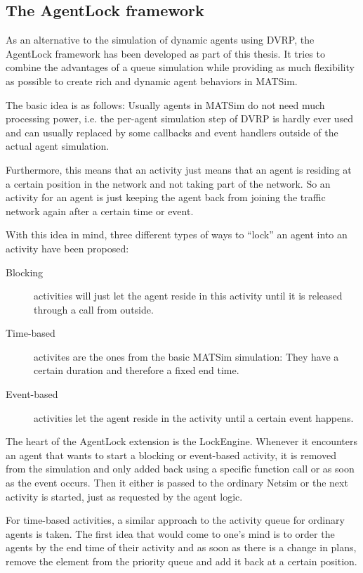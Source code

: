 \subsection{The AgentLock framework}

As an alternative to the simulation of dynamic agents using DVRP, the AgentLock
framework has been developed as part of this thesis. It tries to combine the advantages
of a queue simulation while providing as much flexibility as possible to create
rich and dynamic agent behaviors in MATSim.

The basic idea is as follows: Usually agents in MATSim do not need much processing
power, i.e. the per-agent simulation step of DVRP is hardly ever used and can usually
replaced by some callbacks and event handlers outside of the actual agent simulation.

Furthermore, this means that an activity just means that an agent is residing
at a certain position in the network and not taking part of the network. So an
activity for an agent is just keeping the agent back from joining the traffic network
again after a certain time or event.

With this idea in mind, three different types of ways to ``lock'' an agent into
an activity have been proposed:

\begin{description}
    \item[Blocking] activities will just let the agent reside in this activity until
    it is released through a call from outside.
    \item[Time-based] activites are the ones from the basic MATSim simulation: They
    have a certain duration and therefore a fixed end time.
    \item[Event-based] activities let the agent reside in the activity until a certain
    event happens.
\end{description}

The heart of the AgentLock extension is the LockEngine. Whenever it encounters an
agent that wants to start a blocking or event-based activity, it is removed from
the simulation and only added back using a specific function call or as soon as the
event occurs. Then it either is passed to the ordinary Netsim or the next activity
is started, just as requested by the agent logic.

For time-based activities, a similar approach to the activity queue for ordinary
agents is taken. The first idea that would come to one's mind is to order the
agents by the end time of their activity and as soon as there is a change in plans,
remove the element from the priority queue and add it back at a certain position.

